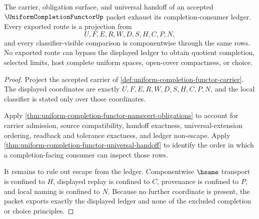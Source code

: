 \begin{theorem}
\label{thm:uniform-completion-functor-ledger-exactness}
The carrier, obligation surface, and universal handoff of an accepted $\UniformCompletionFunctorUp$ packet exhaust its completion-consumer ledger. Every exported route is a projection from
$$
U,F,E,R,W,D,S,H,C,P,N,
$$
and every classifier-visible comparison is componentwise through the same rows. No exported route can bypass the displayed ledger to obtain quotient completion, selected limits, host complete uniform spaces, open-cover compactness, or choice.
\end{theorem}
\begin{proof}
Project the accepted carrier of \autoref{def:uniform-completion-functor-carrier}. The displayed coordinates are exactly $U,F,E,R,W,D,S,H,C,P,N$, and the local classifier is stated only over those coordinates.

Apply \autoref{thm:uniform-completion-functor-namecert-obligations} to account for carrier admission, source compatibility, handoff exactness, universal-extension ordering, readback and tolerance exactness, and ledger non-escape. Apply \autoref{thm:uniform-completion-functor-universal-handoff} to identify the order in which a completion-facing consumer can inspect those rows.

It remains to rule out escape from the ledger. Componentwise $\hsame$ transport is confined to $H$, displayed replay is confined to $C$, provenance is confined to $P$, and local naming is confined to $N$. Because no further coordinate is present, the packet exports exactly the displayed ledger and none of the excluded completion or choice principles.
\end{proof}

